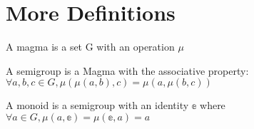 \section{More Definitions}
\usepackage{amsmath, amssymb}

\begin{definition}[Magma]
    \label{definition : Magma}
    \leanok
    A magma is a set G with an operation $\mu$
\end{definition}

\begin{definition}[Semigroup]
    \label{definition : Semigroup}
    \leanok
    A semigroup is a Magma with the associative property: $\forall a, b, c \in G, \mu(\mu(a, b), c) = \mu(a, \mu(b, c))$
\end{definition}

\begin{definition}[Monoid]
    \label{definition : Monoid}
    \leanok
    A monoid is a semigroup with an identity $\mathbb{e}$ where $\forall a \in G, \mu (a, \mathbb{e}) = \mu(\mathbb{e}, a) = a$
\end{definition}
